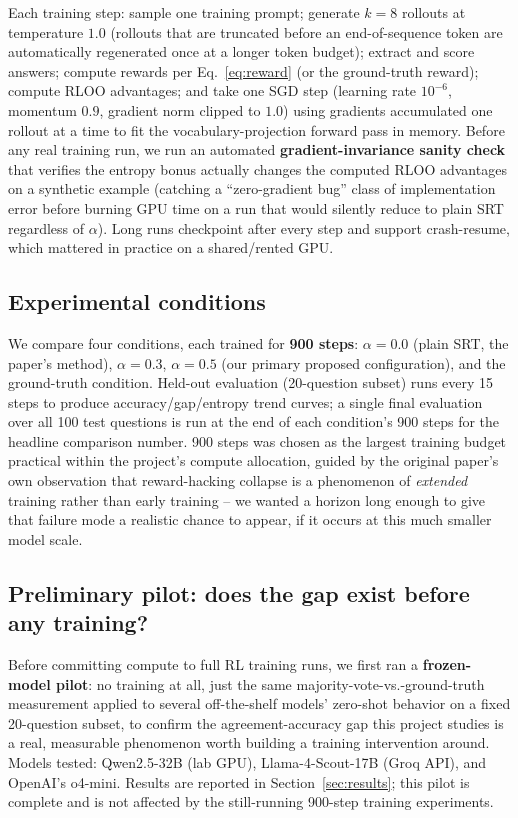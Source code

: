 \documentclass{article}
\begin{document}
Each training step: sample one training prompt; generate $k{=}8$ rollouts at
temperature $1.0$ (rollouts that are truncated before an end-of-sequence
token are automatically regenerated once at a longer token budget); extract
and score answers; compute rewards per Eq.~\ref{eq:reward} (or the ground-truth
reward); compute RLOO advantages; and take one SGD step (learning rate
$10^{-6}$, momentum $0.9$, gradient norm clipped to $1.0$) using gradients
accumulated one rollout at a time to fit the vocabulary-projection forward
pass in memory. Before any real training run, we run an automated
\textbf{gradient-invariance sanity check} that verifies the entropy bonus
actually changes the computed RLOO advantages on a synthetic example
(catching a ``zero-gradient bug'' class of implementation error before
burning GPU time on a run that would silently reduce to plain SRT regardless
of $\alpha$). Long runs checkpoint after every step and support
crash-resume, which mattered in practice on a shared/rented GPU.

\subsection{Experimental conditions}

We compare four conditions, each trained for \textbf{900 steps}: $\alpha{=}0.0$
(plain SRT, the paper's method), $\alpha{=}0.3$, $\alpha{=}0.5$ (our primary
proposed configuration), and the ground-truth condition. Held-out evaluation
(20-question subset) runs every 15 steps to produce accuracy/gap/entropy
trend curves; a single final evaluation over all 100 test questions is run
at the end of each condition's 900 steps for the headline comparison number.
900 steps was chosen as the largest training budget practical within the
project's compute allocation, guided by the original paper's own
observation that reward-hacking collapse is a phenomenon of
\emph{extended} training rather than early training -- we wanted a horizon
long enough to give that failure mode a realistic chance to appear, if it
occurs at this much smaller model scale.

\subsection{Preliminary pilot: does the gap exist before any training?}

Before committing compute to full RL training runs, we first ran a
\textbf{frozen-model pilot}: no training at all, just the same
majority-vote-vs.-ground-truth measurement applied to several off-the-shelf
models' zero-shot behavior on a fixed 20-question subset, to confirm the
agreement-accuracy gap this project studies is a real, measurable phenomenon
worth building a training intervention around. Models tested: Qwen2.5-32B
(lab GPU), Llama-4-Scout-17B (Groq API), and OpenAI's o4-mini. Results are
reported in Section~\ref{sec:results}; this pilot is complete and is not
affected by the still-running 900-step training experiments.
\end{document}
